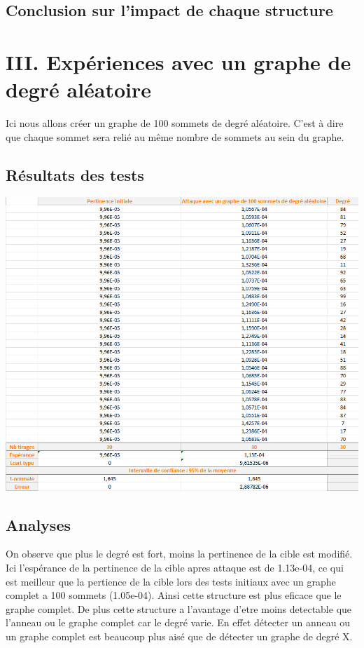 \documentclass[a4paper,11pt]{article}
\begin{document}
	\subsection{Conclusion sur l'impact de chaque structure}


\section{III.	Expériences avec un graphe de degré aléatoire}
	Ici nous allons créer un graphe de 100 sommets de degré aléatoire. C'est à dire que chaque sommet sera relié au même nombre de sommets au sein du graphe.

	\subsection{Résultats des tests}
		\includegraphics[scale = 0.5]{Captures/ranking4.PNG}\\
		
	
	\subsection{Analyses}
		On observe que plus le degré est fort, moins la pertinence de la cible est modifié. Ici l'espérance de la pertinence de la cible apres attaque est de 1.13e-04, ce qui est 
		meilleur que la pertience de la cible lors des tests initiaux avec un graphe complet a 100 sommets (1.05e-04). Ainsi cette structure est plus eficace que le graphe complet.
		De plus cette structure a l'avantage d'etre moins detectable que l'anneau ou le graphe complet car le degré varie. En effet détecter un anneau ou un graphe complet est beaucoup plus aisé 
		que de détecter un graphe de degré X.
	
\end{document}
